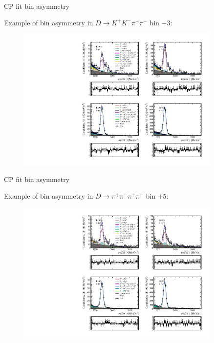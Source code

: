\documentclass{beamer}
\begin{document}
\begin{frame}{CP fit bin asymmetry}
  \begin{center}
    {\large Example of bin asymmetry in $D\to K^+K^-\pi^+\pi^-$ bin $-3$:}
  \end{center}
  \begin{figure}
    \centering
    \includegraphics[width = 0.9\textwidth,trim={0 10cm 0 0},clip=true]{Plots/d2kkpipi_fiveL_binm3.pdf}
  \end{figure}
\end{frame}

\begin{frame}{CP fit bin asymmetry}
  \begin{center}
    {\large Example of bin asymmetry in $D\to\pi^+\pi^-\pi^+\pi^-$ bin $+5$:}
  \end{center}
  \begin{figure}
    \centering
    \includegraphics[width = 0.9\textwidth,trim={0 10cm 0 0},clip=true]{Plots/d2pipipipi_fiveL_binp5.pdf}
  \end{figure}
\end{frame}
\end{document}
